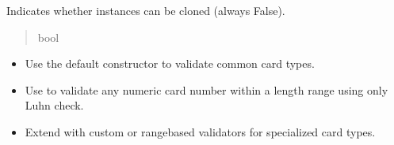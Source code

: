 \documentclass[letterpaper,10pt,english]{sphinxmanual}
\begin{document}
\begin{fulllineitems}
\begin{fulllineitems}
\begin{quote}
\begin{description}
\end{description}\end{quote}

\end{fulllineitems}


\begin{fulllineitems}
\label{\detokenize{apache_commons_validator_python.routines:apache_commons_validator_python.routines.credit_card_validator.CreditCardValidator.cloneable}}
\pysigstartsignatures
{}
\pysigstopsignatures
\sphinxAtStartPar
Indicates whether instances can be cloned (always False).
\begin{quote}\begin{description}
\sphinxAtStartPar
bool

\end{description}\end{quote}

\end{fulllineitems}

\begin{description}
\begin{itemize}
\item {} 
\sphinxAtStartPar
Use the default constructor to validate common card types.

\item {} 
\sphinxAtStartPar
Use  to validate any numeric card
number within a length range using only Luhn check.

\item {} 
\sphinxAtStartPar
Extend with custom  or range\sphinxhyphen{}based validators for
specialized card types.

\end{itemize}

\end{description}


\end{fulllineitems}
\end{document}
